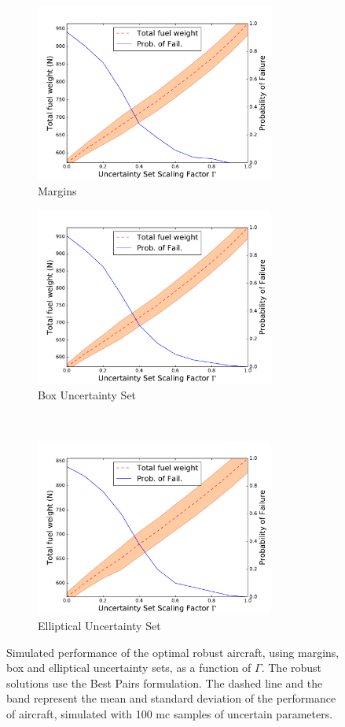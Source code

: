 \begin{figure}[ht]
    \centering
    \captionsetup{justification=centering, font=small}
    \begin{subfigure}{0.49\textwidth}
        \centering
        \includegraphics[height=2.3in]{signomial_simple_flight/margins.pdf}
         \caption{Margins}
    \end{subfigure}%
    \begin{subfigure}{0.49\textwidth}
        \centering
        \includegraphics[height=2.3in]{signomial_simple_flight/box_best_pairs.pdf}
         \caption{Box Uncertainty Set}
    \end{subfigure}%
    \\
    \begin{subfigure}{0.49\textwidth}
        \centering
        \includegraphics[height=2.3in]{signomial_simple_flight/ell_best_pairs.pdf}
         \caption{Elliptical Uncertainty Set}
    \end{subfigure}
    \caption{Simulated performance of the optimal robust aircraft, using margins, box and elliptical uncertainty sets,
    as a function of $\Gamma$. The robust solutions use the Best Pairs formulation.
    The dashed line and the band represent the mean and standard deviation of the performance
    of aircraft, simulated with 100 \gls{mc} samples of uncertain parameters.}
    \label{fig:probOfFailure}
\end{figure}


